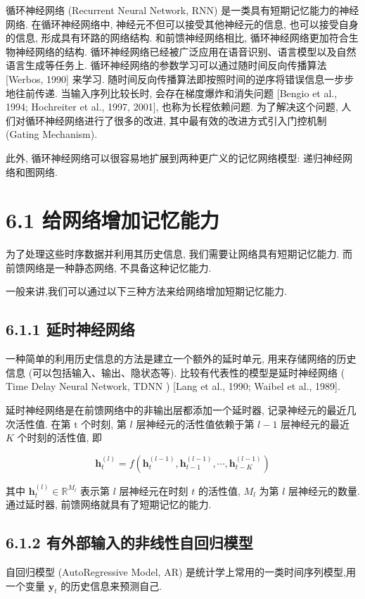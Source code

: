 \documentclass[10pt]{article}
\begin{document}
循环神经网络 (Recurrent Neural Network, RNN) 是一类具有短期记忆能力的神经网络. 在循环神经网络中, 神经元不但可以接受其他神经元的信息, 也可以接受自身的信息, 形成具有环路的网络结构. 和前馈神经网络相比, 循环神经网络更加符合生物神经网络的结构. 循环神经网络已经被广泛应用在语音识别、语言模型以及自然语言生成等任务上. 循环神经网络的参数学习可以通过随时间反向传播算法 [Werbos, 1990] 来学习. 随时间反向传播算法即按照时间的逆序将错误信息一步步地往前传递. 当输入序列比较长时, 会存在梯度爆炸和消失问题 [Bengio et al., 1994; Hochreiter et al., 1997, 2001], 也称为长程依赖问题. 为了解决这个问题, 人们对循环神经网络进行了很多的改进, 其中最有效的改进方式引入门控机制 (Gating Mechanism).

此外, 循环神经网络可以很容易地扩展到两种更广义的记忆网络模型: 递归神经网络和图网络.

\section*{6.1 给网络增加记忆能力}
为了处理这些时序数据并利用其历史信息, 我们需要让网络具有短期记忆能力. 而前馈网络是一种静态网络, 不具备这种记忆能力.

一般来讲,我们可以通过以下三种方法来给网络增加短期记忆能力.

\subsection*{6.1.1 延时神经网络}
一种简单的利用历史信息的方法是建立一个额外的延时单元, 用来存储网络的历史信息 (可以包括输入、输出、隐状态等). 比较有代表性的模型是延时神经网络 ( Time Delay Neural Network, TDNN ) [Lang et al., 1990; Waibel et al., 1989].

延时神经网络是在前馈网络中的非输出层都添加一个延时器, 记录神经元的最近几次活性值. 在第 $\mathrm{t}$ 个时刻, 第 $l$ 层神经元的活性值依赖于第 $l-1$ 层神经元的最近 $K$ 个时刻的活性值, 即


\begin{equation*}
\boldsymbol{h}_{t}^{(l)}=f\left(\boldsymbol{h}_{t}^{(l-1)}, \boldsymbol{h}_{t-1}^{(l-1)}, \cdots, \boldsymbol{h}_{t-K}^{(l-1)}\right) \tag{6.1}
\end{equation*}


其中 $\boldsymbol{h}_{t}^{(l)} \in \mathbb{R}^{M_{l}}$ 表示第 $l$ 层神经元在时刻 $t$ 的活性值, $M_{l}$ 为第 $l$ 层神经元的数量.通过延时器, 前馈网络就具有了短期记忆的能力.

\subsection*{6.1.2 有外部输入的非线性自回归模型}
自回归模型 (AutoRegressive Model, AR) 是统计学上常用的一类时间序列模型,用一个变量 $\boldsymbol{y}_{t}$ 的历史信息来预测自己.
\end{document}
